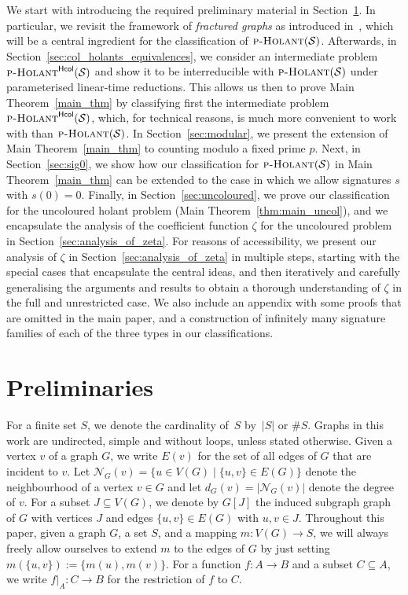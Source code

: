 \documentclass[authorcolumns,numberwithinsect]{no-lipics-v2022}
\newcommand{\holantprob}{\text{\sc{p-Holant}}}
\newcommand{\holantprobstar}{\text{\sc{p-Holant}}^{\mathsf{Hcol}}}
\begin{document}
We start with introducing the required preliminary material in Section~\ref{sec:prelims}. In particular, we revisit the framework of \emph{fractured graphs} as introduced in~\cite{PeyerimhoffRSSVW23}, which will be a central ingredient for the classification of $\holantprob(\mathcal{S})$.
Afterwards, in Section~\ref{sec:col_holants_equivalences}, we consider an intermediate problem $\holantprobstar(\mathcal{S})$ and show it to be interreducible with $\holantprob(\mathcal{S})$ under parameterised linear-time reductions. This allows us then to prove Main Theorem~\ref{main_thm} by classifying first the intermediate problem $\holantprobstar(\mathcal{S})$, which, for technical reasons, is much more convenient to work with than $\holantprob(\mathcal{S})$. In Section~\ref{sec:modular}, we present the extension of Main Theorem~\ref{main_thm} to counting modulo a fixed prime $p$.
Next, in Section~\ref{sec:sig0}, we show how our classification for $\holantprob(\mathcal{S})$ in Main Theorem~\ref{main_thm} can be extended to the case in which we allow signatures $s$ with $s(0)=0$.
Finally, in Section~\ref{sec:uncoloured}, we prove our classification for the uncoloured holant problem (Main Theorem~\ref{thm:main_uncol}), and we encapsulate the analysis of the coefficient function $\zeta$ for the uncoloured problem in Section~\ref{sec:analysis_of_zeta}. For reasons of accessibility, we present our analysis of $\zeta$ in Section~\ref{sec:analysis_of_zeta} in multiple steps, starting with the special cases that encapsulate the central ideas, and then iteratively and carefully generalising the arguments and results to obtain a thorough understanding of $\zeta$ in the full and unrestricted case.
We also include an appendix with some proofs that are omitted in the main paper, and a construction of infinitely many signature families of each of the three types in our classifications.

\newpage
\tableofcontents

\pagebreak


\section{Preliminaries}\label{sec:prelims}

For a finite set $S$, we denote the cardinality of~$S$ by~$|S|$ or $\#S$. Graphs in this work are undirected, simple and without loops, unless stated otherwise. 
Given a vertex $v$ of a graph $G$, we write $E(v)$ for the set of all edges of $G$ that are incident to $v$. Let $\mathcal{N}_{G}(v) = \{u \in V(G) \mid \{u, v\} \in E(G)\}$ denote the neighbourhood of a vertex $v\in G$ and let $d_G(v)=|\mathcal{N}_G(v)|$ denote the degree of $v$. 
For a subset $J\subseteq V(G)$, we denote by $G[J]$ the induced subgraph graph of $G$ with vertices $J$ and edges $\{u,v\}\in E(G)$ with $u,v\in J$. Throughout this paper, given a graph $G$, a set $S$, and a mapping $m: V(G) \to S$, we will always freely allow ourselves to extend $m$ to the edges of $G$ by just setting $m(\{u,v\}):=\{m(u),m(v)\}$. For a function $f:A\to B$ and a subset $C\subseteq A$, we write $f|_A: C \to B$ for the restriction of $f$ to $C$.
\end{document}

